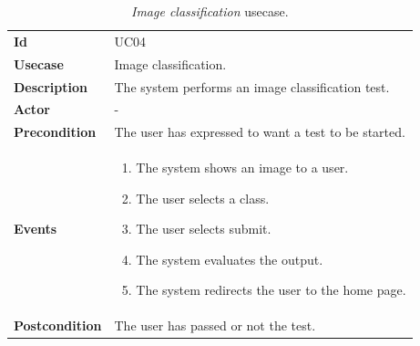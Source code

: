 \begin{table}[h!t]
    \centering
    \caption{\emph{Image classification} usecase.}
    \label{tab:uc:image}
    \centering
    \begin{tabular}{l | p{80mm}}
        \textbf{Id}            & UC04                                                 \\
        \textbf{Usecase}       & Image classification.                                \\
        \textbf{Description}   & The system performs an image classification test.    \\
        \textbf{Actor}         & -                                                    \\
        \textbf{Precondition}  & The user has expressed to want a test to be started. \\
        \textbf{Events}        & \begin{enumerate}
            \item The system shows an image to a user.
            \item The user selects a class.
            \item The user selects submit.
            \item The system evaluates the output.
            \item The system redirects the user to the home page.
        \end{enumerate}                            \\
        \textbf{Postcondition} & The user has passed or not the test.
    \end{tabular}
\end{table}

